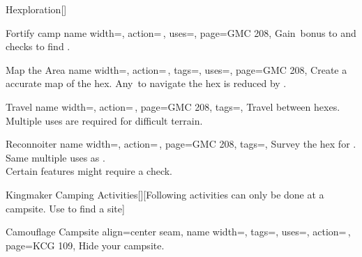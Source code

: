 \begin{PageFront}
\begin{Tables}{\frontTableHeight}
\begin{Table}{Hexploration}[]
\begin{entry}{Fortify camp}{%
                name width=\activityLength,%
                action=\,,
                uses=\Crafting,
                page=GMC 208,
            }
                Gain \,\Cirm bonus to  and  checks to find
                .
            \end{entry}
            \begin{entry}{Map the Area}{%
                name width=\activityLength,%
                action=\,,
                tags=\Concentrate,
                uses=\Survival,
                page=GMC 208,
            }
                Create a accurate map of the hex. Any \DC\,to navigate the hex is reduced by . \hfill
            \end{entry}
            \begin{entry}{Travel}{%
                name width=\activityLength,%
                action=\,,
                page=GMC 208,
                tags=\Move,
            }
                Travel between hexes. Multiple uses are required for difficult terrain.\hfill
                \\
            \end{entry}
            \begin{entry}{Reconnoiter}{%
                name width=\activityLength,%
                action=\,,
                page=GMC 208,
                tags=\Concentrate,
            }
                Survey the hex for .
                Same multiple uses as .\hfill
                \\
                Certain features might require a check.
            \end{entry}
        \end{Table}%
        \vfill
        \begin{Table}{Kingmaker Camping Activities}[][Following activities can only be done at a campsite. Use
         to find a site]
            \begin{entry}{Camouflage Campsite}{%
                align=center seam,
                name width=\activityLength,%
                tags=\Manipulate,
                uses={\Stealth[tags={T,S}]},
                action=\,,
                page=KCG 109,
            }
                Hide your campsite.

\end{entry}
\end{Table}
\end{Tables}
\end{PageFront}
